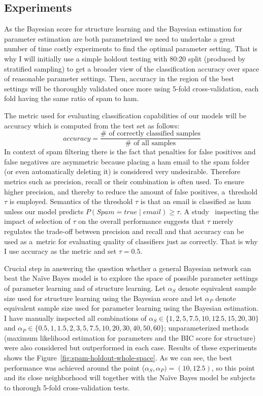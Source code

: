 \documentclass[english,cover]{fitthesis} %
\begin{document}
\subsection{Experiments}
As the Bayesian score for structure learning and the Bayesian estimation for parameter estimation are both parametrized we need to undertake a great number of time costly experiments to find the optimal parameter setting. That is why I will initially use a simple holdout testing with 80:20 split (produced by stratified sampling) to get a broader view of the classification accuracy over space of reasonable parameter settings. Then, accuracy in the region of the best settings will be thoroughly validated once more using 5-fold cross-validation, each fold having the same ratio of spam to ham.

The metric used for evaluating  classification capabilities of our models will be accuracy which is computed from the test set as follows:
$$accuracy = \frac{\# \text{ of correctly classified samples}}{\# \text{ of all samples}}$$
In context of spam filtering there is the fact that penalties for false positives and false negatives are asymmetric because placing a ham email to the spam folder (or even automatically deleting it) is considered very undesirable. Therefore metrics such as precision, recall or their combination is often used. To ensure higher precision, and thereby to reduce the amount of false positives, a~threshold $\tau$ is employed. Semantics of the threshold $\tau$ is that an email is classified as ham unless our model predicts $P(Spam = true \mid email) \geq \tau$.
A study~\cite{androutsopoulos00_spam} inspecting the impact of selection of $\tau$ on the overall performance suggests that $\tau$ merely regulates the trade-off between precision and recall and that accuracy can be used as a~metric for evaluating quality of classifiers just as correctly. That is why I use accuracy as the metric and set $\tau = 0.5$.

\medskip
Crucial step in answering the question whether a general Bayesian network can beat the Naïve Bayes model is to explore the space of possible parameter settings of parameter learning and of structure learning. Let $\alpha_S$ denote equivalent sample size used for structure learning using the Bayesian score and let $\alpha_P$ denote equivalent sample size used for parameter learning using the Bayesian estimation. I have manually inspected all combinations of $\alpha_S \in \lbrace 1, 2, 5, 7.5, 10, 12.5, 15, 20, 30\rbrace$ and $\alpha_P \in \lbrace 0.5, 1, 1.5, 2, 3, 5, 7.5, 10, 20, 30, 40, 50, 60 \rbrace$; unparameterized methods (maximum likelihood estimation for parameters and the BIC score for structure) were also considered but outperformed in each case. Results of these experiments shows the Figure~\ref{fig:spam-holdout-whole-space}. As we can see, the best performance was achieved around the point ($\alpha_S, \alpha_P) = (10, 12.5)$, so this point and its close neighborhood will together with the Naïve Bayes model be subjects to thorough 5-fold cross-validation tests.
\end{document}

